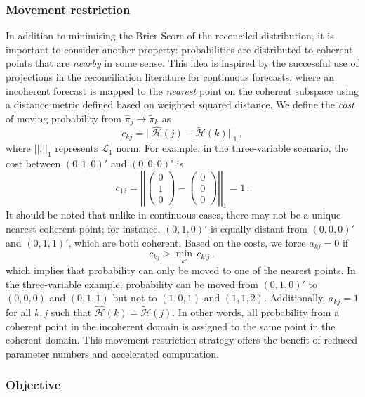 \documentclass[a4paper,review,12pt,authoryear]{elsarticle}
\theoremstyle{definition}
\begin{document}
    \subsubsection*{\textbf{Movement restriction}}
    In addition to minimising the Brier Score of the reconciled distribution, it is important to consider another property: probabilities are distributed to coherent points that are \emph{nearby} in some sense.
    This idea is inspired by the successful use of projections in the reconciliation literature for continuous forecasts, where an incoherent forecast is mapped to the \emph{nearest} point on the coherent subspace using a distance metric defined based on weighted squared distance.
    We define the \emph{cost} of moving probability from $\hat{\pi}_j\rightarrow\tilde{\pi}_k$ as
    \[
    c_{kj}=||\hat{\mathcal{H}}(j)-\tilde{\mathcal{H}}(k)||_1\,,
    \]
    where $||.||_1$ represents $\mathcal{L}_1$ norm. For example, in the three-variable scenario, the cost between $(0, 1, 0)'$ and $(0, 0, 0)$' is
    \[
    c_{12}=\left|\left|\begin{pmatrix}0\\1\\0\end{pmatrix}-\begin{pmatrix}0\\0\\0\end{pmatrix}\right|\right|_1=1\,.
    \]
    It should be noted that unlike in continuous cases, there may not be a unique nearest coherent point; for instance, $(0,1,0)'$ is equally distant from $(0,0,0)'$ and $(0,1,1)'$, which are both coherent.
    Based on the costs, we force $a_{kj}=0$ if
    \[
      c_{kj}>\underset{k'}{\min}\,c_{k'j}\,,
    \]
    which implies that probability can only be moved to one of the nearest points. In the three-variable example, probability can be moved from $(0,1,0)'$ to $(0,0,0)$ and $(0,1,1)$ but not to $(1,0,1)$ and $(1,1,2)$.
    Additionally, $a_{kj}=1$ for all $k,j$ such that $\hat{\mathcal{H}}(k)=\tilde{\mathcal{H}}(j)$.
    In other words, all probability from a coherent point in the incoherent domain is assigned to the same point in the coherent domain.
    This movement restriction strategy offers the benefit of reduced parameter numbers and accelerated computation.


    \subsubsection*{\textbf{Objective}}
\end{document}
